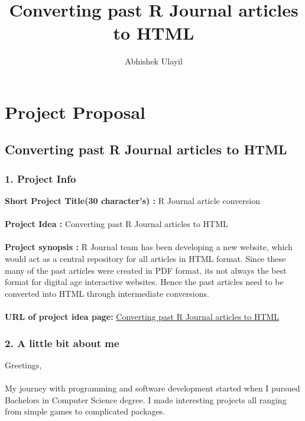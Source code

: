 \documentclass[12pt]{article}
\begin{document}
\author{Abhishek Ulayil}
\title{Converting past R Journal articles to HTML}


\section{Project Proposal}

\subsection{Converting past R Journal articles to HTML}

\subsubsection{1. Project Info}
{\large\bfseries Short Project Title(30 character's) : } {R Journal article conversion}\\
\\
{\large\bfseries Project Idea : } {Converting past R Journal articles to HTML}\\
\\
{\large\bfseries Project synopsis :} R Journal team has been developing a new website, which would act as a central repository for all articles in HTML format. Since these many of the past articles were created in PDF format, its not always the best format for digital age interactive websites. Hence the past articles need to be converted into HTML through intermediate conversions. \\
\\
{\large\bfseries URL of project idea page:} \href{https://github.com/rstats-gsoc/gsoc2022/wiki/Converting-past-R-Journal-articles-to-HTML}{\color{orange}Converting past R Journal articles to HTML}
\subsubsection{2. A little bit about me}
 {\large Greetings},\\
 \\
\hspace*{3mm}My journey with programming and software development started when I pursued Bachelors in Computer Science degree. I made interesting projects all ranging from simple games to complicated packages.
\end{document}
